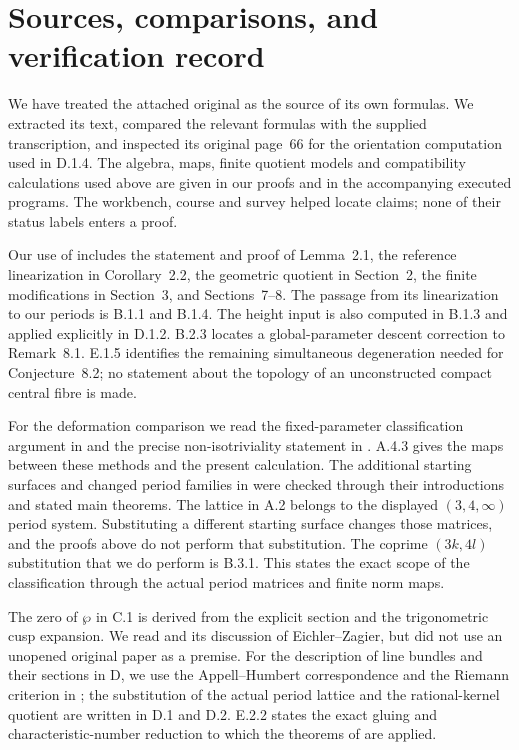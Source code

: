 \section*{Sources, comparisons, and verification record}
We have treated the attached original \cite{AC26} as the source of its
own formulas. We extracted its text, compared the relevant formulas
with the supplied transcription, and inspected its original page~66
for the orientation computation used in D.1.4. The algebra, maps,
finite quotient models and compatibility calculations used above
are given in our proofs and in the accompanying executed programs.
The workbench, course and survey helped locate claims; none of their
status labels enters a proof.

Our use of \cite{E26} includes the statement and proof of Lemma~2.1,
the reference linearization in Corollary~2.2, the geometric quotient
in Section~2, the finite modifications in Section~3, and Sections~7--8.
The passage from its linearization to our periods is B.1.1 and B.1.4.
The height input is also computed in B.1.3 and applied explicitly
in D.1.2. B.2.3 locates a global-parameter descent correction to
Remark~8.1. E.1.5 identifies the remaining simultaneous degeneration
needed for Conjecture~8.2; no statement about the topology of an
unconstructed compact central fibre is made.

For the deformation comparison we read the fixed-parameter
classification argument in \cite[Section~6.2]{Y26} and the precise
non-isotriviality statement in \cite[Proposition~4.7]{VL26}.
A.4.3 gives the maps between these methods and the present
calculation. The additional starting surfaces and changed period
families in \cite{VTwo26,VCombs26,LR26,W26} were checked through
their introductions and stated main theorems. The lattice in A.2
belongs to the displayed $(3,4,\infty)$ period system. Substituting
a different starting surface changes those matrices, and the
proofs above do not perform that substitution. The coprime
$(3k,4l)$ substitution that we do perform is B.3.1. This states
the exact scope of the classification through the actual period
matrices and finite norm maps.

The zero of $\wp$ in C.1 is derived from the explicit section and
the trigonometric cusp expansion. We read
\cite[Theorem~1]{DI08} and its discussion of Eichler--Zagier,
but did not use an unopened original paper as a premise.
For the description of line bundles and their sections in D, we
use the Appell--Humbert correspondence and the Riemann criterion
in \cite[Theorems~4.1 and 4.4]{Schnell19}; the substitution of
the actual period lattice and the rational-kernel quotient are
written in D.1 and D.2. E.2.2 states the exact gluing and
characteristic-number reduction to which the theorems of
\cite{Cerf71,Smale61,EK62} are applied.

